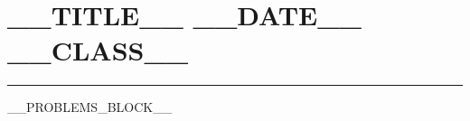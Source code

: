 \documentclass[11pt,a4paper]{article}
\newcommand{\LessonTitle}[1]{\section*{#1}\vspace{-0.5em}\hrule\vspace{0.8em}}
\begin{document}
\LessonTitle{__TITLE__ \hfill __DATE__ \hfill __CLASS__}

__PROBLEMS_BLOCK__
\end{document}
